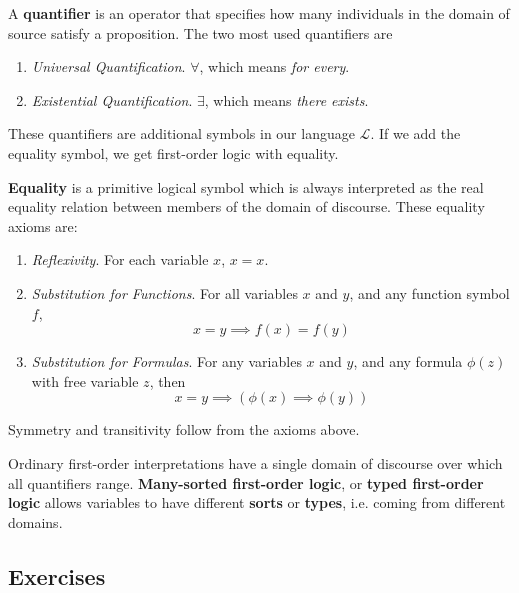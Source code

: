  \begin{definition}[Quantifier]
    A \textbf{quantifier} is an operator that specifies how many individuals in the domain of source satisfy a proposition. The two most used quantifiers are 
    \begin{enumerate}
      \item \textit{Universal Quantification}. $\forall$, which means \textit{for every}. 
      \item \textit{Existential Quantification}. $\exists$, which means \textit{there exists}. 
    \end{enumerate}
  \end{definition} 

  These quantifiers are additional symbols in our language $\mathcal{L}$. If we add the equality symbol, we get first-order logic with equality. 

  \begin{axiom}[Equality]
    \textbf{Equality} is a primitive logical symbol which is always interpreted as the real equality relation between members of the domain of discourse. These equality axioms are: 
    \begin{enumerate}
      \item \textit{Reflexivity}. For each variable $x$, $x = x$. 
      \item \textit{Substitution for Functions}. For all variables $x$ and $y$, and any function symbol $f$, 
        \begin{equation}
          x = y \implies f(x) = f(y)
        \end{equation}
      \item \textit{Substitution for Formulas}. For any variables $x$ and $y$, and any formula $\phi(z)$ with free variable $z$, then 
        \begin{equation}
          x = y \implies (\phi(x) \implies \phi(y))
        \end{equation}
    \end{enumerate}
    Symmetry and transitivity follow from the axioms above. 
  \end{axiom} 

  Ordinary first-order interpretations have a single domain of discourse over which all quantifiers range. \textbf{Many-sorted first-order logic}, or \textbf{typed first-order logic} allows variables to have different \textbf{sorts} or \textbf{types}, i.e. coming from different domains.  

\subsection{Exercises}

